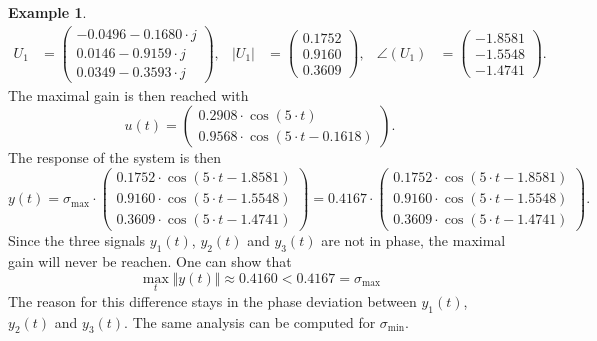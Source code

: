 \documentclass[a4paper,12 pt]{article}
\numberwithin{equation}{section}
\theoremstyle{definition}
\newtheorem{bsp}{Example}
\theoremstyle{remark}
\theoremstyle{definition}
\theoremstyle{definition}
\theoremstyle{definition}
\theoremstyle{remark}
\begin{document}
\begin{bsp}
\begin{align*}
U_1&= \begin{pmatrix}-0.0496 - 0.1680\cdot j \\ 0.0146 - 0.9159\cdot j \\ 0.0349 - 0.3593\cdot j \end{pmatrix}, & |U_1|&=\begin{pmatrix} 0.1752 \\ 0.9160 \\ 0.3609\end{pmatrix}, & \angle(U_1)&=\begin{pmatrix}-1.8581 \\ -1.5548 \\ -1.4741 \end{pmatrix}.
\end{align*}
The maximal gain is then reached with
\begin{equation*}
u(t)=\begin{pmatrix} 0.2908\cdot\cos(5\cdot t) \\ 0.9568\cdot\cos(5\cdot t-0.1618) \end{pmatrix}.
\end{equation*}
The response of the system is then
\begin{equation*}
y(t)=\sigma_\text{max}\cdot\begin{pmatrix}
0.1752\cdot\cos(5\cdot t - 1.8581) \\ 0.9160\cdot\cos(5\cdot t - 1.5548) \\ 0.3609\cdot\cos(5\cdot t - 1.4741)
\end{pmatrix}
=0.4167\cdot\begin{pmatrix}
0.1752\cdot\cos(5\cdot t - 1.8581) \\ 0.9160\cdot\cos(5\cdot t - 1.5548) \\ 0.3609\cdot\cos(5\cdot t - 1.4741)
\end{pmatrix}.
\end{equation*}
Since the three signals $y_1(t)$, $y_2(t)$ and $y_3(t)$ are not in phase, the maximal gain will never be reachen. One can show that
\begin{equation*}
\max_t\Vert y(t)\Vert\approx 0.4160<0.4167=\sigma_\text{max}
\end{equation*}
The reason for this difference stays in the phase deviation between  $y_1(t)$, $y_2(t)$ and $y_3(t)$. The same analysis can be computed for $\sigma_\text{min}$.
\end{bsp}
\end{document}
